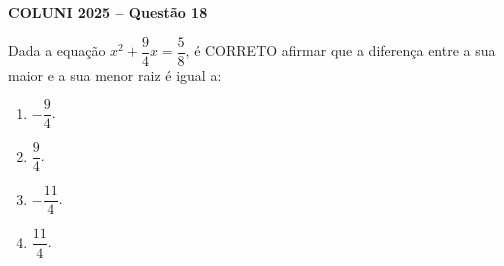 \textbf{COLUNI 2025 -- Questão 18}\par\medskip Dada a equação $x^2+\dfrac94x=\dfrac58$, é CORRETO afirmar que a diferença entre a sua maior e a sua menor raiz é igual a:
\begin{enumerate}
\item $-\dfrac94$.
\item $\dfrac94$.
\item $-\dfrac{11}{4}$.
\item $\dfrac{11}{4}$.
\end{enumerate}
